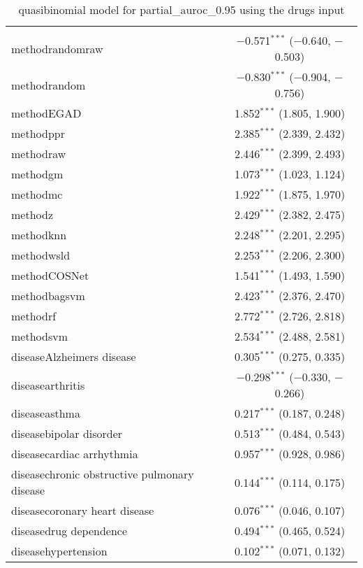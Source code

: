 
\begin{table}[!htbp] \centering 
  \caption{quasibinomial model for partial_auroc_0.95 using the drugs input} 
  \label{} 
\begin{tabular}{@{\extracolsep{5pt}}lc} 
\\[-1.8ex]\hline 
\hline \\[-1.8ex] 
 methodrandomraw & $-$0.571$^{***}$ ($-$0.640, $-$0.503) \\ 
  methodrandom & $-$0.830$^{***}$ ($-$0.904, $-$0.756) \\ 
  methodEGAD & 1.852$^{***}$ (1.805, 1.900) \\ 
  methodppr & 2.385$^{***}$ (2.339, 2.432) \\ 
  methodraw & 2.446$^{***}$ (2.399, 2.493) \\ 
  methodgm & 1.073$^{***}$ (1.023, 1.124) \\ 
  methodmc & 1.922$^{***}$ (1.875, 1.970) \\ 
  methodz & 2.429$^{***}$ (2.382, 2.475) \\ 
  methodknn & 2.248$^{***}$ (2.201, 2.295) \\ 
  methodwsld & 2.253$^{***}$ (2.206, 2.300) \\ 
  methodCOSNet & 1.541$^{***}$ (1.493, 1.590) \\ 
  methodbagsvm & 2.423$^{***}$ (2.376, 2.470) \\ 
  methodrf & 2.772$^{***}$ (2.726, 2.818) \\ 
  methodsvm & 2.534$^{***}$ (2.488, 2.581) \\ 
  diseaseAlzheimers disease & 0.305$^{***}$ (0.275, 0.335) \\ 
  diseasearthritis & $-$0.298$^{***}$ ($-$0.330, $-$0.266) \\ 
  diseaseasthma & 0.217$^{***}$ (0.187, 0.248) \\ 
  diseasebipolar disorder & 0.513$^{***}$ (0.484, 0.543) \\ 
  diseasecardiac arrhythmia & 0.957$^{***}$ (0.928, 0.986) \\ 
  diseasechronic obstructive pulmonary disease & 0.144$^{***}$ (0.114, 0.175) \\ 
  diseasecoronary heart disease & 0.076$^{***}$ (0.046, 0.107) \\ 
  diseasedrug dependence & 0.494$^{***}$ (0.465, 0.524) \\ 
  diseasehypertension & 0.102$^{***}$ (0.071, 0.132) \\ 

\end{tabular}
\end{table}

